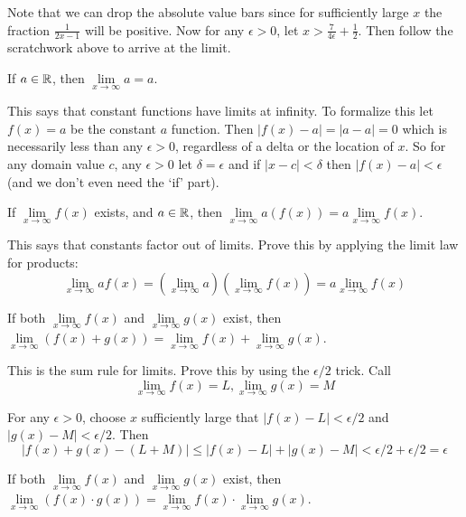 \documentclass{article}
\begin{document}
Note that we can drop the absolute value bars since for sufficiently large $x$ the fraction $\frac{1}{2x - 1}$ will be positive. Now for any $\epsilon > 0$, let $x > \frac{7}{4\epsilon} + \frac{1}{2}$. Then follow the scratchwork above to arrive at the limit.

\begin{problem}
If $a \in \mathbb{R}$, then $\lim\limits_{x\to\infty} a = a$.
\end{problem}

This says that constant functions have limits at infinity. To formalize this let $f(x) = a$ be the constant $a$ function. Then $|f(x) - a| = |a - a| = 0$ which is necessarily less than any $\epsilon > 0$, regardless of a delta or the location of $x$. So for any domain value $c$, any $\epsilon > 0$ let $\delta = \epsilon$ and if $|x - c| < \delta$ then $|f(x) - a| < \epsilon$ (and we don't even need the `if' part).

\begin{problem}
If $\lim\limits_{x\to\infty} f(x)$ exists, and $a \in \mathbb{R}$, then $\lim\limits_{x\to\infty}a(f(x)) = a \lim\limits_{x\to\infty} f(x)$.
\end{problem}

This says that constants factor out of limits. Prove this by applying the limit law for products:
$$\lim_{x\to\infty} af(x) = \left(\lim_{x\to\infty} a\right) \left(\lim_{x\to\infty} f(x)\right) = a \lim_{x\to\infty} f(x)$$

\begin{problem}
If both $\lim\limits_{x\to\infty} f(x)$ and $\lim\limits_{x\to\infty} g(x)$ exist, then $\lim\limits_{x\to\infty} (f(x) + g(x)) = \lim\limits_{x\to\infty} f(x) + \lim\limits_{x\to\infty} g(x)$.
\end{problem}

This is the sum rule for limits. Prove this by using the $\epsilon/2$ trick. Call
$$\lim_{x\to\infty}f(x) = L, \lim_{x\to\infty}g(x) = M$$

For any $\epsilon > 0$, choose $x$ sufficiently large that $|f(x) - L| < \epsilon/2$ and $|g(x) - M| < \epsilon/2$. Then
$$|f(x) + g(x) - (L + M)| \leq |f(x) - L| + |g(x) - M| < \epsilon/2 + \epsilon/2 = \epsilon$$

\begin{problem}
If both $\lim\limits_{x\to\infty} f(x)$ and $\lim\limits_{x\to\infty} g(x)$ exist, then $\lim\limits_{x\to\infty} (f(x) \cdot g(x)) = \lim\limits_{x\to\infty} f(x) \cdot \lim\limits_{x\to\infty} g(x)$.
\end{problem}
\end{document}
